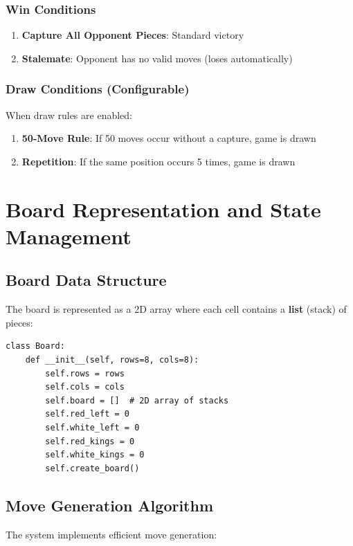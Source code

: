 \documentclass[12pt,a4paper]{article}
\begin{document}
\subsubsection{Win Conditions}
\begin{enumerate}
    \item \textbf{Capture All Opponent Pieces}: Standard victory
    \item \textbf{Stalemate}: Opponent has no valid moves (loses automatically)
\end{enumerate}

\subsubsection{Draw Conditions (Configurable)}
When draw rules are enabled:
\begin{enumerate}
    \item \textbf{50-Move Rule}: If 50 moves occur without a capture, game is drawn
    \item \textbf{Repetition}: If the same position occurs 5 times, game is drawn
\end{enumerate}

\section{Board Representation and State Management}

\subsection{Board Data Structure}

The board is represented as a 2D array where each cell contains a \textbf{list} (stack) of pieces:

\begin{lstlisting}[caption={Board Initialization}]
class Board:
    def __init__(self, rows=8, cols=8):
        self.rows = rows
        self.cols = cols
        self.board = []  # 2D array of stacks
        self.red_left = 0
        self.white_left = 0
        self.red_kings = 0
        self.white_kings = 0
        self.create_board()
\end{lstlisting}

\subsection{Move Generation Algorithm}

The system implements efficient move generation:
\end{document}
